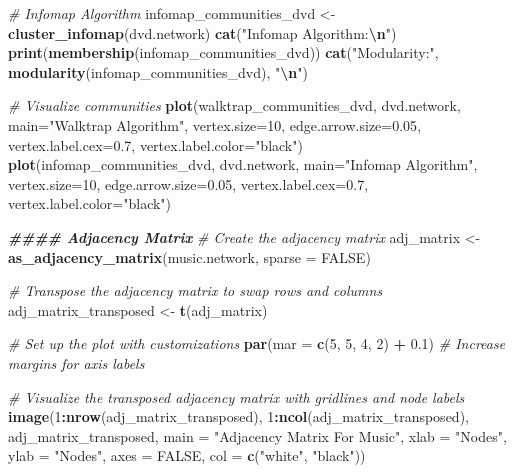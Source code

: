 \documentclass[
]{article}
\newenvironment{Shaded}{\begin{snugshade}}{\end{snugshade}}
\newcommand{\AttributeTok}[1]{\textcolor[rgb]{0.13,0.29,0.53}{#1}}
\newcommand{\CommentTok}[1]{\textcolor[rgb]{0.56,0.35,0.01}{\textit{#1}}}
\newcommand{\ConstantTok}[1]{\textcolor[rgb]{0.56,0.35,0.01}{#1}}
\newcommand{\DecValTok}[1]{\textcolor[rgb]{0.00,0.00,0.81}{#1}}
\newcommand{\DocumentationTok}[1]{\textcolor[rgb]{0.56,0.35,0.01}{\textbf{\textit{#1}}}}
\newcommand{\FloatTok}[1]{\textcolor[rgb]{0.00,0.00,0.81}{#1}}
\newcommand{\FunctionTok}[1]{\textcolor[rgb]{0.13,0.29,0.53}{\textbf{#1}}}
\newcommand{\NormalTok}[1]{#1}
\newcommand{\OtherTok}[1]{\textcolor[rgb]{0.56,0.35,0.01}{#1}}
\newcommand{\SpecialCharTok}[1]{\textcolor[rgb]{0.81,0.36,0.00}{\textbf{#1}}}
\newcommand{\StringTok}[1]{\textcolor[rgb]{0.31,0.60,0.02}{#1}}
\begin{document}
\begin{Shaded}
\begin{Highlighting}[]
\CommentTok{\# Infomap Algorithm}
\NormalTok{infomap\_communities\_dvd }\OtherTok{\textless{}{-}} \FunctionTok{cluster\_infomap}\NormalTok{(dvd.network)}
\FunctionTok{cat}\NormalTok{(}\StringTok{"Infomap Algorithm:}\SpecialCharTok{\textbackslash{}n}\StringTok{"}\NormalTok{)}
\FunctionTok{print}\NormalTok{(}\FunctionTok{membership}\NormalTok{(infomap\_communities\_dvd))}
\FunctionTok{cat}\NormalTok{(}\StringTok{"Modularity:"}\NormalTok{, }\FunctionTok{modularity}\NormalTok{(infomap\_communities\_dvd), }\StringTok{"}\SpecialCharTok{\textbackslash{}n}\StringTok{"}\NormalTok{)}

\CommentTok{\# Visualize communities}
\FunctionTok{plot}\NormalTok{(walktrap\_communities\_dvd, dvd.network, }\AttributeTok{main=}\StringTok{"Walktrap Algorithm"}\NormalTok{, }\AttributeTok{vertex.size=}\DecValTok{10}\NormalTok{, }\AttributeTok{edge.arrow.size=}\FloatTok{0.05}\NormalTok{, }\AttributeTok{vertex.label.cex=}\FloatTok{0.7}\NormalTok{, }\AttributeTok{vertex.label.color=}\StringTok{"black"}\NormalTok{)}
\FunctionTok{plot}\NormalTok{(infomap\_communities\_dvd, dvd.network, }\AttributeTok{main=}\StringTok{"Infomap Algorithm"}\NormalTok{, }\AttributeTok{vertex.size=}\DecValTok{10}\NormalTok{, }\AttributeTok{edge.arrow.size=}\FloatTok{0.05}\NormalTok{, }\AttributeTok{vertex.label.cex=}\FloatTok{0.7}\NormalTok{, }\AttributeTok{vertex.label.color=}\StringTok{"black"}\NormalTok{)}

\DocumentationTok{\#\#\#\# Adjacency Matrix}
\CommentTok{\# Create the adjacency matrix}
\NormalTok{adj\_matrix }\OtherTok{\textless{}{-}} \FunctionTok{as\_adjacency\_matrix}\NormalTok{(music.network, }\AttributeTok{sparse =} \ConstantTok{FALSE}\NormalTok{)}

\CommentTok{\# Transpose the adjacency matrix to swap rows and columns}
\NormalTok{adj\_matrix\_transposed }\OtherTok{\textless{}{-}} \FunctionTok{t}\NormalTok{(adj\_matrix)}

\CommentTok{\# Set up the plot with customizations}
\FunctionTok{par}\NormalTok{(}\AttributeTok{mar =} \FunctionTok{c}\NormalTok{(}\DecValTok{5}\NormalTok{, }\DecValTok{5}\NormalTok{, }\DecValTok{4}\NormalTok{, }\DecValTok{2}\NormalTok{) }\SpecialCharTok{+} \FloatTok{0.1}\NormalTok{)  }\CommentTok{\# Increase margins for axis labels}

\CommentTok{\# Visualize the transposed adjacency matrix with gridlines and node labels}
\FunctionTok{image}\NormalTok{(}\DecValTok{1}\SpecialCharTok{:}\FunctionTok{nrow}\NormalTok{(adj\_matrix\_transposed), }\DecValTok{1}\SpecialCharTok{:}\FunctionTok{ncol}\NormalTok{(adj\_matrix\_transposed), adj\_matrix\_transposed, }
      \AttributeTok{main =} \StringTok{"Adjacency Matrix For Music"}\NormalTok{, }
      \AttributeTok{xlab =} \StringTok{"Nodes"}\NormalTok{, }\AttributeTok{ylab =} \StringTok{"Nodes"}\NormalTok{, }
      \AttributeTok{axes =} \ConstantTok{FALSE}\NormalTok{, }\AttributeTok{col =} \FunctionTok{c}\NormalTok{(}\StringTok{"white"}\NormalTok{, }\StringTok{"black"}\NormalTok{))}


\end{Highlighting}
\end{Shaded}
\end{document}
